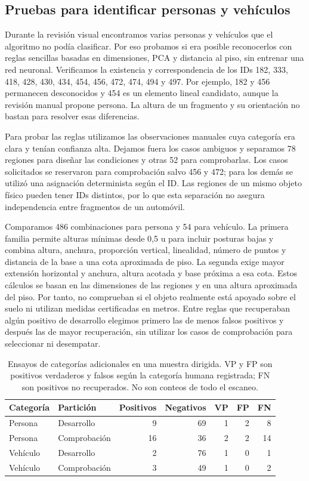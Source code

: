 \documentclass[journal,onecolumn]{IEEEtran}
\begin{document}
\subsection{Pruebas para identificar personas y vehículos}
Durante la revisión visual encontramos varias personas y vehículos que el algoritmo no podía clasificar. Por eso probamos si era posible reconocerlos con reglas sencillas basadas en dimensiones, PCA y distancia al piso, sin entrenar una red neuronal. Verificamos la existencia y correspondencia de los IDs 182, 333, 418, 428, 430, 434, 454, 456, 472, 474, 494 y 497. Por ejemplo, 182 y 456 permanecen desconocidos y 454 es un elemento lineal candidato, aunque la revisión manual propone persona. La altura de un fragmento y su orientación no bastan para resolver esas diferencias.

Para probar las reglas utilizamos las observaciones manuales cuya categoría era clara y tenían confianza alta. Dejamos fuera los casos ambiguos y separamos 78 regiones para diseñar las condiciones y otras 52 para comprobarlas. Los casos solicitados se reservaron para comprobación salvo 456 y 472; para los demás se utilizó una asignación determinista según el ID. Las regiones de un mismo objeto físico pueden tener IDs distintos, por lo que esta separación no asegura independencia entre fragmentos de un automóvil.

Comparamos 486 combinaciones para persona y 54 para vehículo. La primera familia permite alturas mínimas desde 0,5 u para incluir posturas bajas y combina altura, anchura, proporción vertical, linealidad, número de puntos y distancia de la base a una cota aproximada de piso. La segunda exige mayor extensión horizontal y anchura, altura acotada y base próxima a esa cota. Estos cálculos se basan en las dimensiones de las regiones y en una altura aproximada del piso. Por tanto, no comprueban si el objeto realmente está apoyado sobre el suelo ni utilizan medidas certificadas en metros. Entre reglas que recuperaban algún positivo de desarrollo elegimos primero las de menos falsos positivos y después las de mayor recuperación, sin utilizar los casos de comprobación para seleccionar ni desempatar.
\begin{table}[H]
\centering\caption{Ensayos de categorías adicionales en una muestra dirigida. VP y FP son positivos verdaderos y falsos según la categoría humana registrada; FN son positivos no recuperados. No son conteos de todo el escaneo.}\label{tab:nuevas}
\small
\begin{tabular}{llrrrrr}\toprule
Categoría & Partición & Positivos & Negativos & VP & FP & FN\\\midrule
Persona & Desarrollo & 9 & 69 & 1 & 2 & 8\\
Persona & Comprobación & 16 & 36 & 2 & 2 & 14\\
Vehículo & Desarrollo & 2 & 76 & 1 & 0 & 1\\
Vehículo & Comprobación & 3 & 49 & 1 & 0 & 2\\\bottomrule
\end{tabular}
\end{table}
\end{document}
